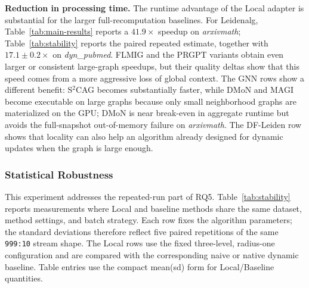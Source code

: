 \documentclass[conference]{IEEEtran}
\theoremstyle{definition}
\begin{document}
\textbf{Reduction in processing time.}
The runtime advantage of the Local adapter is substantial for the larger
full-recomputation baselines.
For Leidenalg, Table~\ref{tab:main-results} reports a $41.9\times$ speedup on
\textit{arxivmath}; Table~\ref{tab:stability} reports the paired repeated
estimate, together with $17.1\pm0.2\times$ on \textit{dyn\_pubmed}.
FLMIG and the PRGPT variants obtain even larger or
consistent large-graph speedups, but their quality deltas show that this speed
comes from a more aggressive loss of global context. The GNN rows show a
different benefit: S$^2$CAG becomes substantially faster, while DMoN and MAGI
become executable on large graphs because only small neighborhood graphs are
materialized on the GPU; DMoN is near break-even in aggregate runtime but avoids
the full-snapshot out-of-memory failure on \textit{arxivmath}. The DF-Leiden row
shows that locality can also help an algorithm already designed for dynamic
updates when the graph is large enough.

\subsubsection{Statistical Robustness}

This experiment addresses the repeated-run part of RQ5. Table~\ref{tab:stability}
reports measurements where Local and baseline methods share the same dataset,
method settings, and batch strategy. Each row fixes the algorithm parameters;
the standard deviations therefore reflect five paired repetitions of the same
\texttt{999:10} stream shape. The Local rows use the fixed three-level,
radius-one configuration and are compared with the corresponding naive or
native dynamic baseline. Table entries use the compact mean(sd) form for
Local/Baseline quantities.
\end{document}
